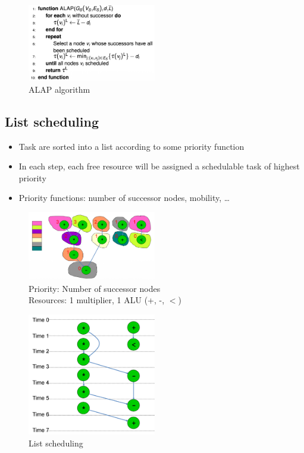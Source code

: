 \begin{figure}[h]
	\begin{center}
		\includegraphics[width=0.5\textwidth]{images/ALAP.png}
		\caption{ALAP algorithm}
		\label{fig:ALAP_algo}
	\end{center}
\end{figure}

\subsection{List scheduling}
\begin{itemize}
	\item Task are sorted into a list according to some priority function
	\item In each step, each free resource will be assigned a schedulable task of highest priority
	\item Priority functions: number of successor nodes, mobility, \dots
\end{itemize}

\begin{figure}[h]
	\begin{center}
		\includegraphics[width=0.5\textwidth]{images/List_scheduling_graph.png}
		\caption{Priority: Number of successor nodes \\
		Resources: 1 multiplier, 1 ALU (+, -, $<$)}
		\label{fig:list_scheduling_graph}
	\end{center}
\end{figure}

\begin{figure}
	\begin{center}
		\includegraphics[width=0.5\textwidth]{images/List_scheduling.png}
		\caption{List scheduling}
		\label{fig:list_scheduling}
	\end{center}
\end{figure}

